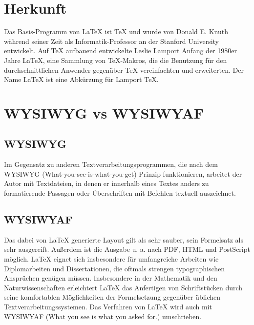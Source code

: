 \documentclass[12pt, a4paper]{article}
\begin{document}
\tableofcontents

\pagebreak 
\section{Herkunft}

Das Basis-Programm von LaTeX ist TeX und wurde von Donald E. Knuth während seiner Zeit als Informatik-Professor an der Stanford University entwickelt. Auf TeX aufbauend entwickelte Leslie Lamport Anfang der 1980er Jahre LaTeX, eine Sammlung von TeX-Makros, die die Benutzung für den durchschnittlichen Anwender gegenüber TeX vereinfachten und erweiterten. Der Name LaTeX ist eine Abkürzung für Lamport TeX. 

\pagebreak
\section{WYSIWYG vs WYSIWYAF}

\subsection{WYSIWYG}
Im Gegensatz zu anderen Textverarbeitungsprogrammen, die nach dem WYSIWYG (What-you-see-is-what-you-get) Prinzip funktionieren, arbeitet der Autor mit Textdateien, in denen er innerhalb eines Textes anders zu formatierende Passagen oder Überschriften mit Befehlen textuell auszeichnet.

\subsection{WYSIWYAF}
Das dabei von LaTeX generierte Layout gilt als sehr sauber, sein Formelsatz als sehr ausgereift. Außerdem ist die Ausgabe u. a. nach PDF, HTML und PostScript möglich. LaTeX eignet sich insbesondere für umfangreiche Arbeiten wie Diplomarbeiten und Dissertationen, die oftmals strengen typographischen Ansprüchen genügen müssen. Insbesondere in der Mathematik und den Naturwissenschaften erleichtert LaTeX das Anfertigen von Schriftstücken durch seine komfortablen Möglichkeiten der Formelsetzung gegenüber üblichen Textverarbeitungssystemen. Das Verfahren von LaTeX wird auch mit WYSIWYAF (What you see is what you asked for.) umschrieben. 
\end{document}
